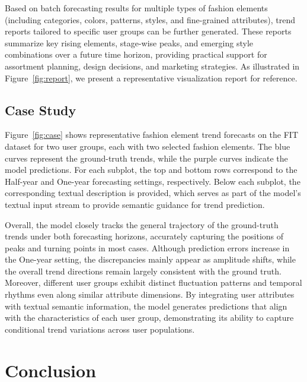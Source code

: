 \documentclass[Afour,sageh,times]{sagej}
\begin{document}
{Based on batch forecasting results for multiple types of fashion elements (including categories, colors, patterns, styles, and fine-grained attributes), trend reports tailored to specific user groups can be further generated. These reports summarize key rising elements, stage-wise peaks, and emerging style combinations over a future time horizon, providing practical support for assortment planning, design decisions, and marketing strategies. As illustrated in Figure~\ref{fig:report}, we present a representative visualization report for reference.

\subsection{Case Study}

Figure~\ref{fig:case} shows representative fashion element trend forecasts on the FIT dataset for two user groups, each with two selected fashion elements. The blue curves represent the ground-truth trends, while the purple curves indicate the model predictions. For each subplot, the top and bottom rows correspond to the Half-year and One-year forecasting settings, respectively. Below each subplot, the corresponding textual description is provided, which serves as part of the model's textual input stream to provide semantic guidance for trend prediction.  

Overall, the model closely tracks the general trajectory of the ground-truth trends under both forecasting horizons, accurately capturing the positions of peaks and turning points in most cases. Although prediction errors increase in the One-year setting, the discrepancies mainly appear as amplitude shifts, while the overall trend directions remain largely consistent with the ground truth. Moreover, different user groups exhibit distinct fluctuation patterns and temporal rhythms even along similar attribute dimensions. By integrating user attributes with textual semantic information, the model generates predictions that align with the characteristics of each user group, demonstrating its ability to capture conditional trend variations across user populations.

\section{Conclusion}

}
\end{document}
